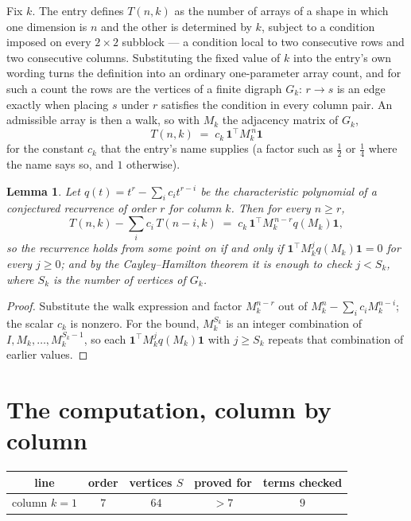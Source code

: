 \documentclass[11pt,a4paper]{article}
\theoremstyle{plain}
\newtheorem{lemma}[theorem]{Lemma}
\theoremstyle{definition}
\begin{document}
Fix $k$. The entry defines $T(n,k)$ as the number of arrays of a shape in which one dimension
is $n$ and the other is determined by $k$, subject to a condition imposed on every
$2\times2$ subblock --- a condition local to two consecutive rows and two consecutive columns.
Substituting the fixed value of $k$ into the entry's own wording turns the definition into an
ordinary one-parameter array count, and for such a count the rows are the vertices of a finite
digraph $G_k$: $r\to s$ is an edge exactly when placing $s$ under $r$ satisfies the condition
in every column pair. An admissible array is then a walk, so with $M_k$ the adjacency matrix
of $G_k$,
\[
T(n,k)\;=\;c_k\,\mathbf{1}^{\!\top}M_k^{\,n}\mathbf{1}
\]
for the constant $c_k$ that the entry's name supplies (a factor such as $\tfrac12$ or
$\tfrac14$ where the name says so, and $1$ otherwise).

\begin{lemma}\label{lem:crit}
Let $q(t)=t^{r}-\sum_i c_it^{r-i}$ be the characteristic polynomial of a conjectured
recurrence of order $r$ for column $k$. Then for every $n\ge r$,
\[
T(n,k)-\sum_i c_i\,T(n-i,k)\;=\;c_k\,\mathbf{1}^{\!\top}M_k^{\,n-r}q(M_k)\mathbf{1},
\]
so the recurrence holds from some point on if and only if
$\mathbf{1}^{\!\top}M_k^{j}q(M_k)\mathbf{1}=0$ for every $j\ge0$; and by the
Cayley--Hamilton theorem it is enough to check $j<S_k$, where $S_k$ is the number of vertices
of $G_k$.
\end{lemma}

\begin{proof}
Substitute the walk expression and factor $M_k^{n-r}$ out of $M_k^{n}-\sum_ic_iM_k^{n-i}$;
the scalar $c_k$ is nonzero. For the bound, $M_k^{S_k}$ is an integer combination of
$I,M_k,\dots,M_k^{S_k-1}$, so each $\mathbf{1}^{\!\top}M_k^{j}q(M_k)\mathbf{1}$ with
$j\ge S_k$ repeats that combination of earlier values.
\end{proof}

\section{The computation, column by column}

\begin{center}
\begin{tabular}{ccccc}
line & order & vertices $S$ & proved for & terms checked \\ \hline
column $k$$=1$ & $7$ & $64$ & $>7$ & $9$ \\
\end{tabular}
\end{center}
\end{document}
